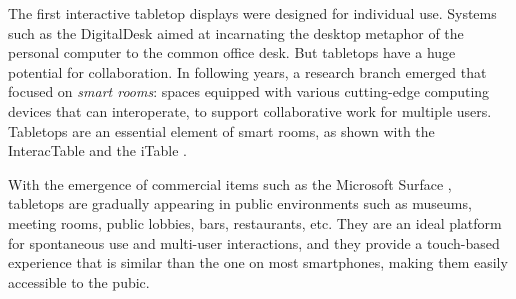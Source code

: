 The first interactive tabletop displays were designed for individual use.
Systems such as the DigitalDesk \citep{Wellner:1993:digitaldesk} aimed at incarnating the desktop metaphor of the personal computer to the common office desk.
But tabletops have a huge potential for collaboration.
In following years, a research branch emerged that focused on \emph{smart rooms}: spaces equipped with various cutting-edge computing devices that can interoperate, to support collaborative work for multiple users.
Tabletops are an essential element of smart rooms, as shown with the InteracTable \citep{Streitz:1999:iland} and the iTable \citep{Johanson:2002:iroom}.

With the emergence of commercial items such as the Microsoft Surface \citeyearpar{ms}, tabletops are gradually appearing in public environments such as museums, meeting rooms, public lobbies, bars, restaurants, etc.
They are an ideal platform for spontaneous use and multi-user interactions, and they provide a touch-based experience that is similar than the one on most smartphones, making them easily accessible to the pubic.\\
\linebreak
%
%

